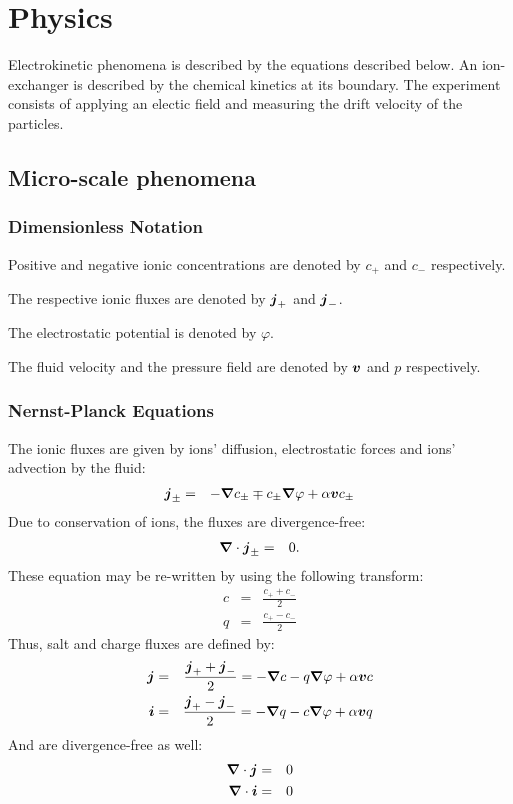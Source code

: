 \section{Physics}
Electrokinetic phenomena is described by the equations described below.
An ion-exchanger is described by the chemical kinetics at its boundary.
The experiment consists of applying an electic field and measuring the drift velocity of the particles.

\subsection{Micro-scale phenomena}

\subsubsection{Dimensionless Notation}
Positive and negative ionic concentrations are denoted by $c_+$ and $c_-$ respectively.

The respective ionic fluxes are denoted by $\boldsymbol{j}_+$ and $\boldsymbol{j}_-$.

The electrostatic potential is denoted by $\varphi$. 

The fluid velocity and the pressure field are denoted by $\boldsymbol{v}$ and $p$ respectively.

\subsubsection{Nernst-Planck Equations}
The ionic fluxes are given by ions' diffusion, electrostatic forces and ions' advection by the fluid:
\begin{eqnarray}
  \boldsymbol{j}_\pm &=& -\boldsymbol{\nabla} c_\pm \mp c_\pm \boldsymbol{\nabla} \varphi + \alpha \boldsymbol{v} c_\pm
\end{eqnarray}
Due to conservation of ions, the fluxes are divergence-free:
\begin{eqnarray}
\boldsymbol{\nabla} \cdot \boldsymbol{j}_\pm &=& 0.
\end{eqnarray}
These equation may be re-written by using the following transform:
\begin{eqnarray}
  c &=& \frac{c_+ + c_-}{2}\\
  q &=& \frac{c_+ - c_-}{2}
\end{eqnarray}
Thus, salt and charge fluxes are defined by:
\begin{eqnarray}
  \boldsymbol{j} &=& \frac{\boldsymbol{j}_+ + \boldsymbol{j}_-}{2} = -\boldsymbol{\nabla} c - q \boldsymbol{\nabla} \varphi + \alpha \boldsymbol{v} c \\
  \boldsymbol{i} &=& \frac{\boldsymbol{j}_+ - \boldsymbol{j}_-}{2} = -\boldsymbol{\nabla} q - c \boldsymbol{\nabla} \varphi + \alpha \boldsymbol{v} q
\end{eqnarray}
And are divergence-free as well:
\begin{eqnarray}
\boldsymbol{\nabla} \cdot \boldsymbol{j} &=& 0 \\
\boldsymbol{\nabla} \cdot \boldsymbol{i} &=& 0 
\end{eqnarray}

